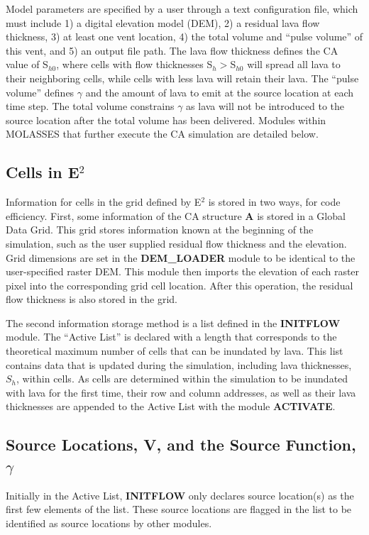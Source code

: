 \documentclass[12pt,letter]{article}
\begin{document}
		Model parameters are specified by a user through a text configuration file, which must include 1) a digital elevation model (DEM), 2) a residual lava flow thickness, 3) at least one vent location, 4) the total volume and ``pulse volume'' of this vent, and 5) an output file path. The lava flow thickness defines the CA value of S$_{h0}$, where cells with flow thicknesses S$_h>$S$_{h0}$ will spread all lava to their neighboring cells, while cells with less lava will retain their lava. The ``pulse volume'' defines $\gamma$ and the amount of lava to emit at the source location at each time step. The total volume constrains $\gamma$ as lava will not be introduced to the source location after the total volume has been delivered. Modules within MOLASSES that further execute the CA simulation are detailed below.
		
	\subsection{Cells in E$^2$}
		Information for cells in the grid defined by E$^2$ is stored in two ways, for code efficiency. First, some information of the CA structure \textbf{A} is stored in a Global Data Grid. This grid stores information known at the beginning of the simulation, such as the user supplied residual flow thickness and the elevation. Grid dimensions are set in the \textbf{DEM\_LOADER} module to be identical to the user-specified raster DEM. This module then imports the elevation of each raster pixel into the corresponding grid cell location. After this operation, the residual flow thickness is also stored in the grid.

		The second information storage method is a list defined in the \textbf{INITFLOW} module. The ``Active List'' is declared with a length that corresponds to the theoretical maximum number of cells that can be inundated by lava. This list contains data that is updated during the simulation, including lava thicknesses, $S_h$, within cells. As cells are determined within the simulation to be inundated with lava for the first time, their row and column addresses, as well as their lava thicknesses are appended to the Active List with the module \textbf{ACTIVATE}.
		
	\subsection{Source Locations, V, and the Source Function, $\gamma$}
		Initially in the Active List, \textbf{INITFLOW} only declares source location(s) as the first few elements of the list. These source locations are flagged in the list to be identified as source locations by other modules.
\end{document}
